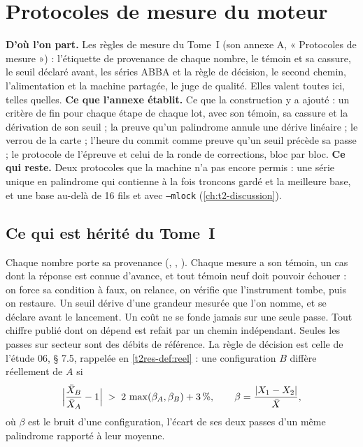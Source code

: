 \chapter{Protocoles de mesure du moteur}\label{t2ann:protocoles}

\begin{origine}
\textbf{D'où l'on part.} Les règles de mesure du Tome~I (son annexe A, « Protocoles de mesure ») : l'étiquette de provenance de chaque nombre, le témoin et sa cassure, le seuil déclaré avant, les séries ABBA et la règle de décision, le second chemin, l'alimentation et la machine partagée, le juge de qualité. Elles valent toutes ici, telles quelles.
\textbf{Ce que l'annexe établit.} Ce que la construction y a ajouté : un critère de fin pour chaque étape de chaque lot, avec son témoin, sa cassure et la dérivation de son seuil ; la preuve qu'un palindrome annule une dérive linéaire ; le verrou de la carte ; l'heure du commit comme preuve qu'un seuil précède sa passe ; le protocole de l'épreuve et celui de la ronde de corrections, bloc par bloc.
\textbf{Ce qui reste.} Deux protocoles que la machine n'a pas encore permis : une série unique en palindrome qui contienne à la fois troncons gardé et la meilleure base, et une base au-delà de 16 fils et avec \texttt{--mlock} (\cref{ch:t2-discussion}).
\end{origine}

\section{Ce qui est hérité du Tome~I}\label{t2ann:sec:herite}

Chaque nombre porte sa provenance (\mes, \calc, \litt). Chaque mesure a son témoin, un cas dont la réponse est connue d'avance, et tout témoin neuf doit pouvoir échouer : on force sa condition à faux, on relance, on vérifie que l'instrument tombe, puis on restaure. Un seuil dérive d'une grandeur mesurée que l'on nomme, et se déclare avant le lancement. Un coût ne se fonde jamais sur une seule passe. Tout chiffre publié dont on dépend est refait par un chemin indépendant. Seules les passes sur secteur sont des débits de référence. La règle de décision est celle de l'étude 06, § 7.5, rappelée en \cref{t2res-def:reel} : une configuration $B$ diffère réellement de $A$ si
\begin{equation}\label{t2ann:eq:regle}
\Bigl|\frac{\bar X_B}{\bar X_A} - 1\Bigr| \;>\; 2\,\max(\beta_A, \beta_B) + 3\,\%,
\qquad \beta = \frac{|X_1 - X_2|}{\bar X},
\end{equation}
où $\beta$ est le bruit d'une configuration, l'écart de ses deux passes d'un même palindrome rapporté à leur moyenne.

